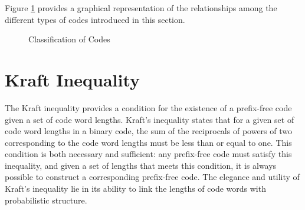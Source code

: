 Figure \ref{fig:Classification-Codes} provides a graphical representation of the relationships among the different types of codes introduced in this section.

\begin{figure}[t]
\centering
{}
\caption{\label{fig:Classification-Codes}Classification of Codes}
\end{figure}






%
%

\section{Kraft Inequality}

The Kraft inequality provides a condition for the existence of a prefix-free code given a set of code word lengths. Kraft's inequality states that for a given set of code word lengths in a binary code, the sum of the reciprocals of powers of two corresponding to the code word lengths must be less than or equal to one. This condition is both necessary and sufficient: any prefix-free code must satisfy this inequality, and given a set of lengths that meets this condition, it is always possible to construct a corresponding prefix-free code. The elegance and utility of Kraft's inequality lie in its ability to link the lengths of code words with probabilistic structure.

